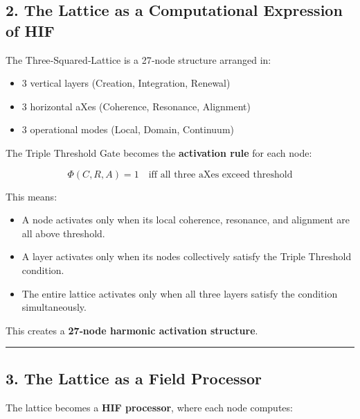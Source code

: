 \subsection{2. The Lattice as a Computational Expression of HIF}\label{the-lattice-as-a-computational-expression-of-hif}

The Three‑Squared‑Lattice is a 27‑node structure arranged in:

\begin{itemize}
\tightlist
\item
  3 vertical layers (Creation, Integration, Renewal)\\
\item
  3 horizontal aXes (Coherence, Resonance, Alignment)\\
\item
  3 operational modes (Local, Domain, Continuum)
\end{itemize}

The Triple Threshold Gate becomes the \textbf{activation rule} for each node:

\[
\Phi(C,R,A) = 1 \quad \text{iff all three aXes exceed threshold}
\]

This means:

\begin{itemize}
\tightlist
\item
  A node activates only when its local coherence, resonance, and alignment are all above threshold.\\
\item
  A layer activates only when its nodes collectively satisfy the Triple Threshold condition.\\
\item
  The entire lattice activates only when all three layers satisfy the condition simultaneously.
\end{itemize}

This creates a \textbf{27‑node harmonic activation structure}.

\begin{center}\rule{0.5\linewidth}{0.5pt}\end{center}

\subsection{3. The Lattice as a Field Processor}\label{the-lattice-as-a-field-processor}

The lattice becomes a \textbf{HIF processor}, where each node computes:

